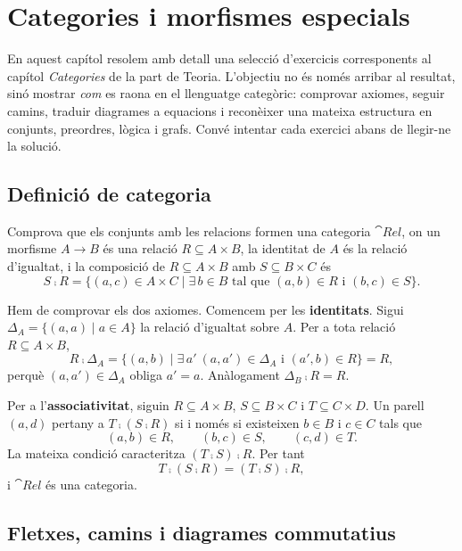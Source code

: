 \chapter[Categories]{Categories i morfismes especials}

En aquest capítol resolem amb detall una selecció d'exercicis corresponents al capítol \emph{Categories} de la part de Teoria. L'objectiu no és només arribar al resultat, sinó mostrar \emph{com} es raona en el llenguatge categòric: comprovar axiomes, seguir camins, traduir diagrames a equacions i reconèixer una mateixa estructura en conjunts, preordres, lògica i grafs. Convé intentar cada exercici abans de llegir-ne la solució.

\section{Definició de categoria}

\begin{exercici}
Comprova que els conjunts amb les relacions formen una categoria $\cat{Rel}$, on un morfisme $A\to B$ és una relació $R\subseteq A\times B$, la identitat de $A$ és la relació d'igualtat, i la composició de $R\subseteq A\times B$ amb $S\subseteq B\times C$ és
\[
S\comp R=\{(a,c)\in A\times C\mid \exists\,b\in B\text{ tal que }(a,b)\in R\text{ i }(b,c)\in S\}.
\]
\end{exercici}

\begin{solucio}
Hem de comprovar els dos axiomes. Comencem per les \textbf{identitats}. Sigui $\Delta_A=\{(a,a)\mid a\in A\}$ la relació d'igualtat sobre $A$. Per a tota relació $R\subseteq A\times B$,
\[
R\comp\Delta_A
=\{(a,b)\mid \exists\,a'\ (a,a')\in\Delta_A\text{ i }(a',b)\in R\}
=R,
\]
perquè $(a,a')\in\Delta_A$ obliga $a'=a$. Anàlogament $\Delta_B\comp R=R$.

Per a l'\textbf{associativitat}, siguin $R\subseteq A\times B$, $S\subseteq B\times C$ i $T\subseteq C\times D$. Un parell $(a,d)$ pertany a $T\comp(S\comp R)$ si i només si existeixen $b\in B$ i $c\in C$ tals que
\[
(a,b)\in R,
\qquad
(b,c)\in S,
\qquad
(c,d)\in T.
\]
La mateixa condició caracteritza $(T\comp S)\comp R$. Per tant
\[
T\comp(S\comp R)=(T\comp S)\comp R,
\]
i $\cat{Rel}$ és una categoria.
\end{solucio}

\section{Fletxes, camins i diagrames commutatius}

